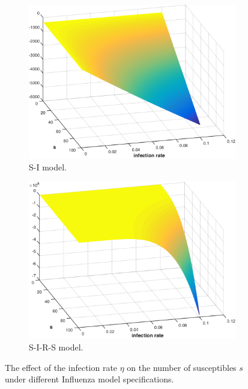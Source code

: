 \begin{figure}[h!]
    \centering
    \begin{subfigure}[b]{0.5\textwidth}    
        \centering
        \includegraphics[width=0.8\linewidth, height=0.55\linewidth]{images/sd_infection_s}
        \caption{S-I model.}
        \label{fig:influenza_sd_value_function}
        \vspace{1em}
    \end{subfigure}  
    \begin{subfigure}[b]{0.5\textwidth}    
        \centering
        \includegraphics[width=0.8\linewidth, height=0.55\linewidth]{images/sir_infection_s}
        \caption{S-I-R-S model.}
        \label{fig:influenza_sirs_value_function}
        \vspace{1em}
       \end{subfigure}         
    \caption{The effect of the infection rate {\footnotesize $\eta$} on the number of susceptibles {\footnotesize $s$} under different Influenza model specifications.}
    \label{fig:influenza_sd}    
\end{figure}

